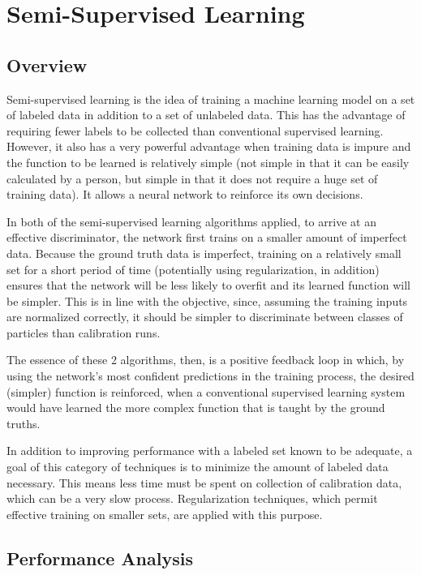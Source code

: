 \documentclass[10pt]{article}
\begin{document}
\section{Semi-Supervised Learning} \label{semi_supervised}

\subsection{Overview}

Semi-supervised learning is the idea of training a machine learning model on a set of labeled data in addition to a set of unlabeled data. This has the advantage of requiring fewer labels to be collected than conventional supervised learning. However, it also has a very powerful advantage when training data is impure and the function to be learned is relatively simple (not simple in that it can be easily calculated by a person, but simple in that it does not require a huge set of training data). It allows a neural network to reinforce its own decisions.

In both of the semi-supervised learning algorithms applied, to arrive at an effective discriminator, the network first trains on a smaller amount of imperfect data. Because the ground truth data is imperfect, training on a relatively small set for a short period of time (potentially using regularization, in addition) ensures that the network will be less likely to overfit and its learned function will be simpler. This is in line with the objective, since, assuming the training inputs are normalized correctly, it should be simpler to discriminate between classes of particles than calibration runs.

The essence of these 2 algorithms, then, is a positive feedback loop in which, by using the network's most confident predictions in the training process, the desired (simpler) function is reinforced, when a conventional supervised learning system would have learned the more complex function that is taught by the ground truths.

In addition to improving performance with a labeled set known to be adequate, a goal of this category of techniques is to minimize the amount of labeled data necessary. This means less time must be spent on collection of calibration data, which can be a very slow process. Regularization techniques, which permit effective training on smaller sets, are applied with this purpose.

\subsection{Performance Analysis}
\end{document}
